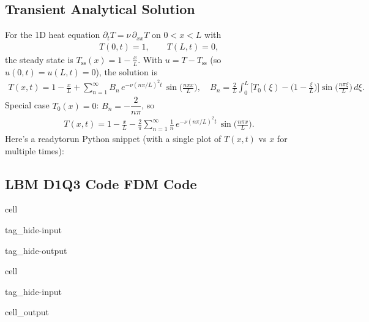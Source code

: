 \documentclass[letterpaper,10pt,english,openany,oneside]{jupyterBook}
\begin{document}
\subsection{Transient Analytical Solution}
\label{\detokenize{Refs/LBM-Study/FDM-Belloti/FDM-LBM-Diffusive:transient-analytical-solution}}
\sphinxAtStartPar
For the 1D heat equation \(\partial_t T=\nu\,\partial_{xx}T\) on \(0<x<L\) with
\begin{equation*}
\begin{split}
T(0,t)=1,\qquad T(L,t)=0,
\end{split}
\end{equation*}
\sphinxAtStartPar
the steady state is \(T_{\text{ss}}(x)=1-\tfrac{x}{L}\). With \(u=T-T_{\text{ss}}\) (so \(u(0,t)=u(L,t)=0\)), the solution is
\begin{equation*}
\begin{split}
T(x,t)=1-\frac{x}{L}+\sum_{n=1}^{\infty} B_n\,e^{-\nu (n\pi/L)^2 t}\,\sin\!\Big(\frac{n\pi x}{L}\Big),
\quad
B_n=\frac{2}{L}\int_0^L\!\Big[T_0(\xi)-\Big(1-\frac{\xi}{L}\Big)\Big]\sin\!\Big(\frac{n\pi \xi}{L}\Big)\,d\xi.
\end{split}
\end{equation*}
\sphinxAtStartPar
Special case \(T_0(x)=0\): \(B_n=-\dfrac{2}{n\pi}\), so
\begin{equation*}
\begin{split}
T(x,t)=1-\frac{x}{L}-\frac{2}{\pi}\sum_{n=1}^{\infty}\frac{1}{n}\,e^{-\nu (n\pi/L)^2 t}\,\sin\!\Big(\frac{n\pi x}{L}\Big).
\end{split}
\end{equation*}
\sphinxAtStartPar
Here’s a ready\sphinxhyphen{}to\sphinxhyphen{}run Python snippet (with a single plot of \(T(x,t)\) vs \(x\) for multiple times):


\subsection{LBM D1Q3 Code \sphinxhyphen{} FDM Code}
\label{\detokenize{Refs/LBM-Study/FDM-Belloti/FDM-LBM-Diffusive:lbm-d1q3-code-fdm-code}}
\begin{sphinxuseclass}{cell}
\begin{sphinxuseclass}{tag_hide-input}
\begin{sphinxuseclass}{tag_hide-output}
\end{sphinxuseclass}
\end{sphinxuseclass}
\end{sphinxuseclass}
\begin{sphinxuseclass}{cell}
\begin{sphinxuseclass}{tag_hide-input}\begin{sphinxVerbatimOutput}

\begin{sphinxuseclass}{cell_output}
\noindent{}

\end{sphinxuseclass}\end{sphinxVerbatimOutput}

\end{sphinxuseclass}
\end{sphinxuseclass}
\end{document}
